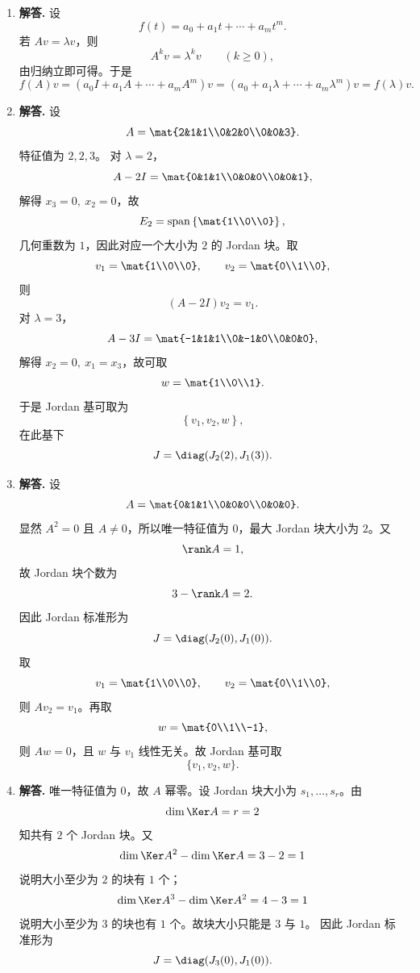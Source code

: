 \begin{enumerate}[label=\textbf{\arabic*.}, leftmargin=*, itemsep=1em]
\item \textbf{解答.} 设
\[
f(t)=a_0+a_1t+\cdots+a_mt^m.
\]
若 \(Av=\lambda v\)，则
\[
A^kv=\lambda^k v\qquad (k\ge0),
\]
由归纳立即可得。于是
\[
f(A)v=(a_0I+a_1A+\cdots+a_mA^m)v
=(a_0+a_1\lambda+\cdots+a_m\lambda^m)v=f(\lambda)v.
\]

\item \textbf{解答.} 设
\[
A=\mat{2&1&1\\0&2&0\\0&0&3}.
\]
特征值为 \(2,2,3\)。  
对 \(\lambda=2\)，
\[
A-2I=\mat{0&1&1\\0&0&0\\0&0&1},
\]
解得 \(x_3=0,\ x_2=0\)，故
\[
E_2=\operatorname{span}\left\{\mat{1\\0\\0}\right\},
\]
几何重数为 \(1\)，因此对应一个大小为 \(2\) 的 Jordan 块。取
\[
v_1=\mat{1\\0\\0},\qquad v_2=\mat{0\\1\\0},
\]
则
\[
(A-2I)v_2=v_1.
\]
对 \(\lambda=3\)，
\[
A-3I=\mat{-1&1&1\\0&-1&0\\0&0&0},
\]
解得 \(x_2=0,\ x_1=x_3\)，故可取
\[
w=\mat{1\\0\\1}.
\]
于是 Jordan 基可取为
\[
\left\{v_1,v_2,w\right\},
\]
在此基下
\[
J=\diag(J_2(2),J_1(3)).
\]

\item \textbf{解答.} 设
\[
A=\mat{0&1&1\\0&0&0\\0&0&0}.
\]
显然 \(A^2=0\) 且 \(A\neq0\)，所以唯一特征值为 \(0\)，最大 Jordan 块大小为 \(2\)。又
\[
\rank A=1,
\]
故 Jordan 块个数为
\[
3-\rank A=2.
\]
因此 Jordan 标准形为
\[
J=\diag(J_2(0),J_1(0)).
\]
取
\[
v_1=\mat{1\\0\\0},\qquad v_2=\mat{0\\1\\0},
\]
则 \(Av_2=v_1\)。再取
\[
w=\mat{0\\1\\-1},
\]
则 \(Aw=0\)，且 \(w\) 与 \(v_1\) 线性无关。故 Jordan 基可取
\[
\{v_1,v_2,w\}.
\]

\item \textbf{解答.} 唯一特征值为 \(0\)，故 \(A\) 幂零。设 Jordan 块大小为 \(s_1,\dots,s_r\)。由
\[
\dim\Ker A=r=2
\]
知共有 \(2\) 个 Jordan 块。又
\[
\dim\Ker A^2-\dim\Ker A=3-2=1
\]
说明大小至少为 \(2\) 的块有 \(1\) 个；
\[
\dim\Ker A^3-\dim\Ker A^2=4-3=1
\]
说明大小至少为 \(3\) 的块也有 \(1\) 个。故块大小只能是 \(3\) 与 \(1\)。  
因此 Jordan 标准形为
\[
J=\diag(J_3(0),J_1(0)).
\]


\end{enumerate}
